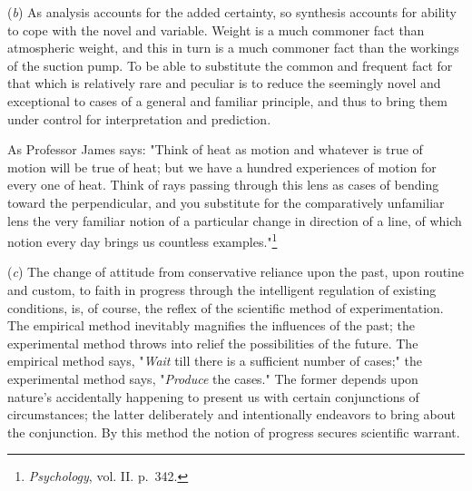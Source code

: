 \documentclass[letterpaper]{book}
\begin{document}
(\emph{b}) As analysis accounts for the added certainty, so synthesis
accounts for ability to cope with the novel and variable. Weight is a
much commoner fact than atmospheric weight, and this in turn is a much
commoner fact than the workings of the suction pump. To be able to
substitute the common and frequent fact for that which is relatively
rare and peculiar is to reduce the seemingly novel and exceptional to
cases of a general and familiar principle, and thus to bring them under
control for interpretation and prediction.

As Professor James says: "Think of heat as motion and whatever is true
of motion will be true of heat; but we have a hundred experiences of
motion for every one of heat. Think of rays passing through this lens as
cases of bending toward the perpendicular, and
you
substitute for the comparatively unfamiliar lens the very familiar
notion of a particular change in direction of a line, of which notion
every day brings us countless
examples."\footnote{\emph{Psychology}, vol. II. p.\ 342.}


(\emph{c}) The change of attitude from conservative reliance upon the
past, upon routine and custom, to faith in progress through the
intelligent regulation of existing conditions, is, of course, the reflex
of the scientific method of experimentation. The empirical method
inevitably magnifies the influences of the past; the experimental method
throws into relief the possibilities of the future. The empirical method
says, "\emph{Wait} till there is a sufficient number of cases;" the
experimental method says, "\emph{Produce} the cases." The former depends
upon nature's accidentally happening to present us with certain
conjunctions of circumstances; the latter deliberately and intentionally
endeavors to bring about the conjunction. By this method the notion of
progress secures scientific warrant.

\end{document}
